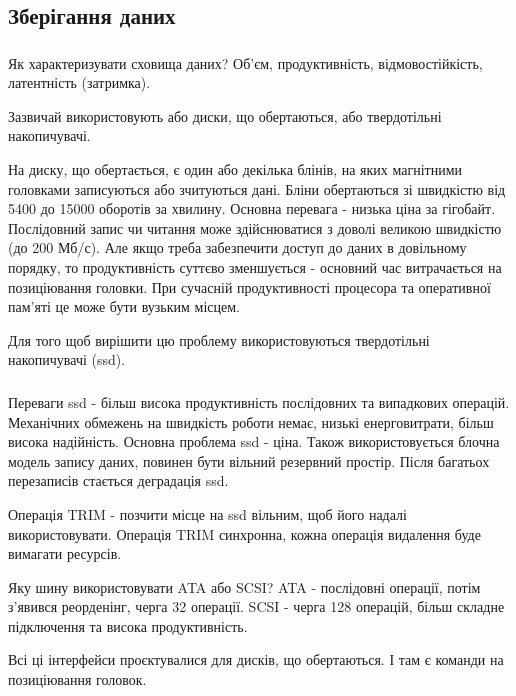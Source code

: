 \documentclass[t]{beamer}  %
\begin{document}
\subsection{Зберігання даних}

\begin{frame}
 	\frametitle{\insertsection} 
 	\framesubtitle{\insertsubsection}

Як характеризувати сховища даних? Об'єм, продуктивність, відмовостійкість, латентність (затримка).

Зазвичай використовують або диски, що обертаються, або твердотільні накопичувачі.

На диску, що обертається, є один або декілька блінів, на яких магнітними головками записуються або зчитуються дані. Бліни обертаються зі швидкістю від 5400 до 15000 оборотів за хвилину. Основна перевага - низька ціна за гігобайт. Послідовний запис чи читання може здійснюватися з доволі великою швидкістю (до 200 Мб/с). Але якщо треба забезпечити доступ до даних в довільному порядку, то продуктивність суттєво зменшується - основний час витрачається на позиціювання головки. При сучасній продуктивності процесора та оперативної пам'яті це може бути вузьким місцем.

Для того щоб вирішити цю проблему використовуються твердотільні накопичувачі (ssd).
\end{frame}

\begin{frame}
 	\frametitle{\insertsection} 
 	\framesubtitle{\insertsubsection}
Переваги ssd - більш висока продуктивність послідовних та випадкових операцій. Механічних обмежень на швидкість роботи немає, низькі енерговитрати, більш висока надійність. Основна проблема ssd - ціна. Також використовується блочна модель запису даних, повинен бути вільний резервний простір. Після багатьох перезаписів стається деградація ssd.

Операція TRIM - позчити місце на ssd вільним, щоб його надалі використовувати. Операція TRIM синхронна, кожна операція видалення буде вимагати ресурсів.

Яку шину використовувати ATA або SCSI? ATA - послідовні операції, потім з'явився реорденінг, черга 32 операції. SCSI - черга 128 операцій, більш складне підключення та висока продуктивність.

Всі ці інтерфейси проєктувалися для дисків, що обертаються. І там є команди на позиціювання головок.
\end{frame}
\end{document}
